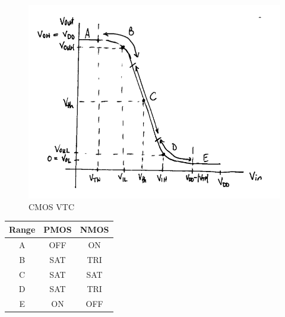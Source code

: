 \documentclass[12pt,letterpaper]{article}
\begin{document}
\begin{figure}[h!]
  \centering
  \includegraphics[width=5.5in]{cmos_vtc.png}
  \caption{CMOS VTC}
  \label{fig:pa}
\end{figure}

\begin{table}[h!]
    \renewcommand{\arraystretch}{1.3}
    \setlength{\tabcolsep}{12pt}
    \begin{center}
        \begin{tabular}{|c|c|c|}\hline
        Range & PMOS & NMOS\\\hline
        A & OFF & ON \\\hline
        B & SAT & TRI \\\hline
        C & SAT & SAT \\\hline
        D & SAT & TRI \\\hline
        E & ON & OFF \\\hline
        \end{tabular}
    \end{center}
    \label{tab:tim}
\end{table}
\end{document}
